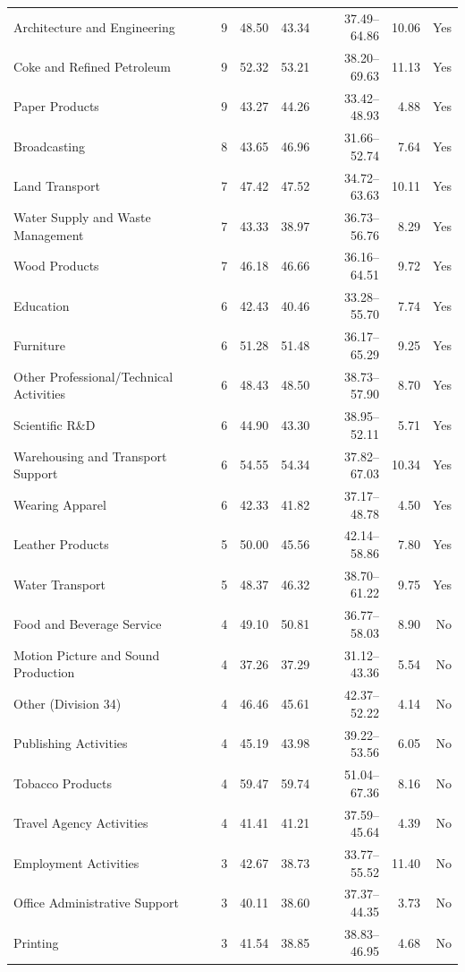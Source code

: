 {\begin{longtable}{@{}L{6.0cm}rrrrrr@{}}
Architecture and Engineering & 9 & 48.50 & 43.34 & 37.49--64.86 & 10.06 & Yes \\
Coke and Refined Petroleum & 9 & 52.32 & 53.21 & 38.20--69.63 & 11.13 & Yes \\
Paper Products & 9 & 43.27 & 44.26 & 33.42--48.93 & 4.88 & Yes \\
Broadcasting & 8 & 43.65 & 46.96 & 31.66--52.74 & 7.64 & Yes \\
Land Transport & 7 & 47.42 & 47.52 & 34.72--63.63 & 10.11 & Yes \\
Water Supply and Waste Management & 7 & 43.33 & 38.97 & 36.73--56.76 & 8.29 & Yes \\
Wood Products & 7 & 46.18 & 46.66 & 36.16--64.51 & 9.72 & Yes \\
Education & 6 & 42.43 & 40.46 & 33.28--55.70 & 7.74 & Yes \\
Furniture & 6 & 51.28 & 51.48 & 36.17--65.29 & 9.25 & Yes \\
Other Professional/Technical Activities & 6 & 48.43 & 48.50 & 38.73--57.90 & 8.70 & Yes \\
Scientific R\&D & 6 & 44.90 & 43.30 & 38.95--52.11 & 5.71 & Yes \\
Warehousing and Transport Support & 6 & 54.55 & 54.34 & 37.82--67.03 & 10.34 & Yes \\
Wearing Apparel & 6 & 42.33 & 41.82 & 37.17--48.78 & 4.50 & Yes \\
Leather Products & 5 & 50.00 & 45.56 & 42.14--58.86 & 7.80 & Yes \\
Water Transport & 5 & 48.37 & 46.32 & 38.70--61.22 & 9.75 & Yes \\
Food and Beverage Service & 4 & 49.10 & 50.81 & 36.77--58.03 & 8.90 & No \\
Motion Picture and Sound Production & 4 & 37.26 & 37.29 & 31.12--43.36 & 5.54 & No \\
Other (Division 34) & 4 & 46.46 & 45.61 & 42.37--52.22 & 4.14 & No \\
Publishing Activities & 4 & 45.19 & 43.98 & 39.22--53.56 & 6.05 & No \\
Tobacco Products & 4 & 59.47 & 59.74 & 51.04--67.36 & 8.16 & No \\
Travel Agency Activities & 4 & 41.41 & 41.21 & 37.59--45.64 & 4.39 & No \\
Employment Activities & 3 & 42.67 & 38.73 & 33.77--55.52 & 11.40 & No \\
Office Administrative Support & 3 & 40.11 & 38.60 & 37.37--44.35 & 3.73 & No \\
Printing & 3 & 41.54 & 38.85 & 38.83--46.95 & 4.68 & No \\

\end{longtable}}
